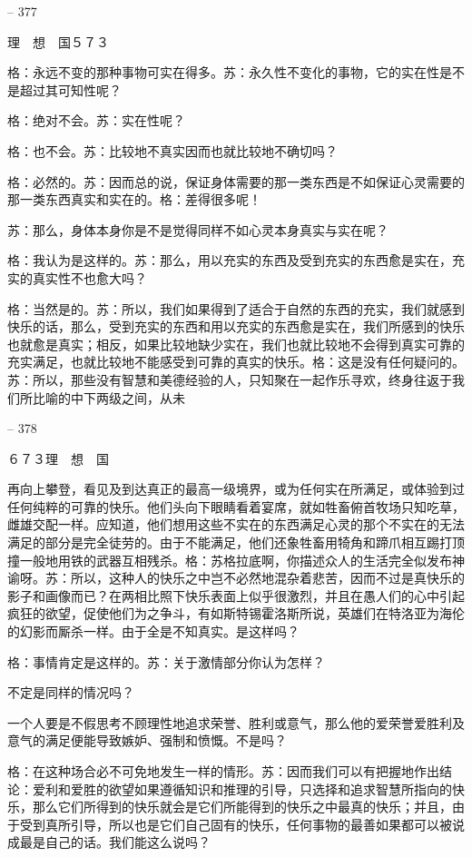 \documentclass[11pt,oneside]{book}
\begin{document}
\begin{common-format}
    

-- 377

    理　想　国５７３

    格：永远不变的那种事物可实在得多。苏：永久性不变化的事物，它的实在性是不是超过其可知性呢？

    格：绝对不会。苏：实在性呢？

    格：也不会。苏：比较地不真实因而也就比较地不确切吗？

    格：必然的。苏：因而总的说，保证身体需要的那一类东西是不如保证心灵需要的那一类东西真实和实在的。格：差得很多呢！

    苏：那么，身体本身你是不是觉得同样不如心灵本身真实与实在呢？

    格：我认为是这样的。苏：那么，用以充实的东西及受到充实的东西愈是实在，充实的真实性不也愈大吗？

    格：当然是的。苏：所以，我们如果得到了适合于自然的东西的充实，我们就感到快乐的话，那么，受到充实的东西和用以充实的东西愈是实在，我们所感到的快乐也就愈是真实；相反，如果比较地缺少实在，我们也就比较地不会得到真实可靠的充实满足，也就比较地不能感受到可靠的真实的快乐。格：这是没有任何疑问的。苏：所以，那些没有智慧和美德经验的人，只知聚在一起作乐寻欢，终身往返于我们所比喻的中下两级之间，从未

    

-- 378

    ６７３理　想　国

    再向上攀登，看见及到达真正的最高一级境界，或为任何实在所满足，或体验到过任何纯粹的可靠的快乐。他们头向下眼睛看着宴席，就如牲畜俯首牧场只知吃草，雌雄交配一样。应知道，他们想用这些不实在的东西满足心灵的那个不实在的无法满足的部分是完全徒劳的。由于不能满足，他们还象牲畜用犄角和蹄爪相互踢打顶撞一般地用铁的武器互相残杀。格：苏格拉底啊，你描述众人的生活完全似发布神谕呀。苏：所以，这种人的快乐之中岂不必然地混杂着悲苦，因而不过是真快乐的影子和画像而已？在两相比照下快乐表面上似乎很激烈，并且在愚人们的心中引起疯狂的欲望，促使他们为之争斗，有如斯特锡霍洛斯所说，英雄们在特洛亚为海伦的幻影而厮杀一样。由于全是不知真实。是这样吗？

    格：事情肯定是这样的。苏：关于激情部分你认为怎样？

    不定是同样的情况吗？

    一个人要是不假思考不顾理性地追求荣誉、胜利或意气，那么他的爱荣誉爱胜利及意气的满足便能导致嫉妒、强制和愤慨。不是吗？

    格：在这种场合必不可免地发生一样的情形。苏：因而我们可以有把握地作出结论：爱利和爱胜的欲望如果遵循知识和推理的引导，只选择和追求智慧所指向的快乐，那么它们所得到的快乐就会是它们所能得到的快乐之中最真的快乐；并且，由于受到真所引导，所以也是它们自己固有的快乐，任何事物的最善如果都可以被说成最是自己的话。我们能这么说吗？


\end{common-format}
\end{document}
